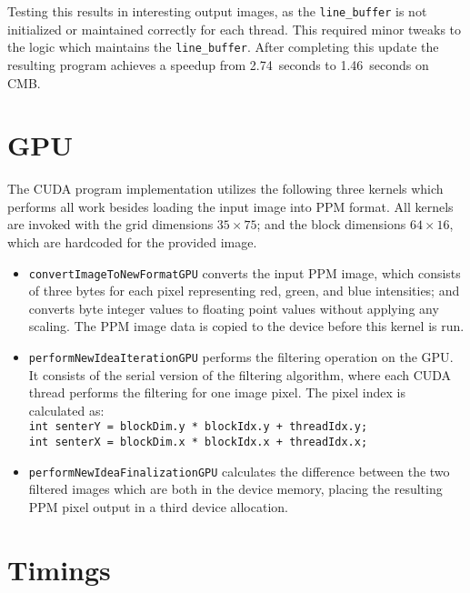 Testing this results in interesting output images, as the \texttt{line\_buffer} is not initialized or maintained correctly for each thread. This required minor tweaks to the logic which maintains the \texttt{line\_buffer}. After completing this update the resulting program achieves a speedup from 2.74~seconds to 1.46~seconds on \ac{CMB}.

\section*{\ac{GPU}}

The \ac{CUDA} program implementation utilizes the following three kernels which performs all work besides loading the input image into \ac{PPM} format. All kernels are invoked with the grid dimensions $35 \times 75$; and the block dimensions $64 \times 16$, which are hardcoded for the provided image.

\begin{itemize}
\item \texttt{convertImageToNewFormatGPU} converts the input \ac{PPM} image, which consists of three bytes for each pixel representing red, green, and blue intensities; and converts byte integer values to floating point values without applying any scaling. The \ac{PPM} image data is copied to the device before this kernel is run.
\item \texttt{performNewIdeaIterationGPU} performs the filtering operation on the \ac{GPU}. It consists of the serial version of the filtering algorithm, where each \ac{CUDA} thread performs the filtering for one image pixel. The pixel index is calculated as:\\[0.2cm]
\texttt{int senterY = blockDim.y * blockIdx.y + threadIdx.y;\\
int senterX = blockDim.x * blockIdx.x + threadIdx.x;}
\item \texttt{performNewIdeaFinalizationGPU} calculates the difference between the two filtered images which are both in the device memory, placing the resulting \ac{PPM} pixel output in a third device allocation.
\end{itemize}

\section*{Timings}

